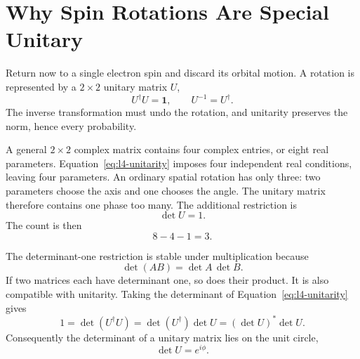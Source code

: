 \section{Why Spin Rotations Are Special Unitary}

Return now to a single electron spin and discard its orbital motion. A rotation
is represented by a \(2\times2\) unitary matrix \(U\),
\begin{equation}
U^\dagger U=\boldsymbol 1,
\qquad
U^{-1}=U^\dagger.
\label{eq:l4-unitarity}
\end{equation}
The inverse transformation must undo the rotation, and unitarity preserves the
norm, hence every probability.

A general \(2\times2\) complex matrix contains four complex entries, or eight
real parameters. Equation~\eqref{eq:l4-unitarity} imposes four independent real
conditions, leaving four parameters. An ordinary spatial rotation has only
three: two parameters choose the axis and one chooses the angle. The unitary
matrix therefore contains one phase too many. The additional restriction is
\begin{equation}
\det U=1.
\label{eq:l4-det-one}
\end{equation}
The count is then
\begin{equation}
8-4-1=3.
\end{equation}

The determinant-one restriction is stable under multiplication because
\begin{equation}
\det(AB)=\det A\,\det B.
\end{equation}
If two matrices each have determinant one, so does their product. It is also
compatible with unitarity. Taking the determinant of
Equation~\eqref{eq:l4-unitarity} gives
\begin{equation}
1=\det(U^\dagger U)
=\det(U^\dagger)\det U
=(\det U)^*\det U.
\end{equation}
Consequently the determinant of a unitary matrix lies on the unit circle,
\begin{equation}
\det U=e^{i\phi}.
\end{equation}

\begin{classroomqa}
\end{classroomqa}

